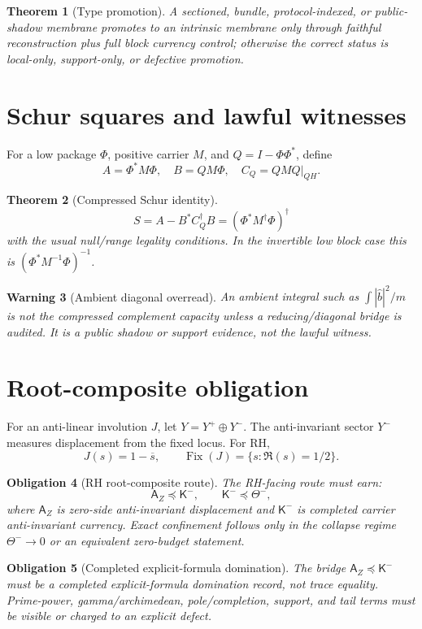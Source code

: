 \documentclass[11pt]{article}
\newtheorem{theorem}{Theorem}[section]
\newtheorem{warning}[theorem]{Warning}
\newtheorem{obligation}[theorem]{Obligation}
\DeclareMathOperator{\Fix}{Fix}
\begin{document}
\begin{theorem}[Type promotion]
A sectioned, bundle, protocol-indexed, or public-shadow membrane promotes to an intrinsic membrane only through faithful reconstruction plus full block currency control; otherwise the correct status is local-only, support-only, or defective promotion.
\end{theorem}

\section{Schur squares and lawful witnesses}
For a low package \(\Phi\), positive carrier \(M\), and \(Q=I-\Phi\Phi^*\), define
\[
A=\Phi^*M\Phi,
\quad B=QM\Phi,
\quad C_Q=QMQ|_{QH}.
\]

\begin{theorem}[Compressed Schur identity]
\[
S=A-B^*C_Q^\dagger B=(\Phi^*M^\dagger\Phi)^\dagger
\]
with the usual null/range legality conditions.  In the invertible low block case this is \((\Phi^*M^{-1}\Phi)^{-1}\).
\end{theorem}

\begin{warning}[Ambient diagonal overread]
An ambient integral such as \(\int |\widehat b|^2/m\) is not the compressed complement capacity unless a reducing/diagonal bridge is audited.  It is a public shadow or support evidence, not the lawful witness.
\end{warning}

\section{Root-composite obligation}
For an anti-linear involution \(J\), let \(Y=Y^+\oplus Y^-\).  The anti-invariant sector \(Y^-\) measures displacement from the fixed locus.  For RH,
\[
J(s)=1-\overline{s},\qquad \Fix(J)=\{s: \Re(s)=1/2\}.
\]

\begin{obligation}[RH root-composite route]
The RH-facing route must earn:
\[
  \mathsf A_Z\preceq \mathsf K^-,
\qquad
  \mathsf K^-\preceq \Theta^-,
\]
where \(\mathsf A_Z\) is zero-side anti-invariant displacement and \(\mathsf K^-\) is completed carrier anti-invariant currency.  Exact confinement follows only in the collapse regime \(\Theta^-\to0\) or an equivalent zero-budget statement.
\end{obligation}

\begin{obligation}[Completed explicit-formula domination]
The bridge \(\mathsf A_Z\preceq\mathsf K^-\) must be a completed explicit-formula domination record, not trace equality.  Prime-power, gamma/archimedean, pole/completion, support, and tail terms must be visible or charged to an explicit defect.
\end{obligation}
\end{document}
